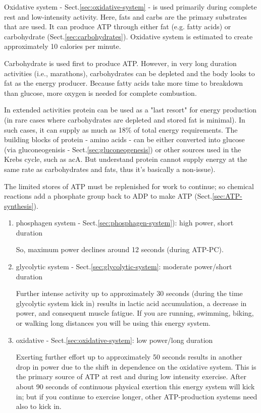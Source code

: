 \begin{mdframed}

Oxidative system - Sect.\ref{sec:oxidative-system} - is used primarily during
complete rest and low-intensity activity. Here, fats and carbs are the primary
substrates that are used. It can produce ATP through either fat (e.g. fatty
acids) or carbohydrate (Sect.\ref{sec:carbohydrates}).
Oxidative system is estimated to create approximately 10 calories per minute.

Carbohydrate is used first to produce ATP. However, in very long duration
activities (i.e., marathons), carbohydrates can be depleted and the body looks
to fat as the energy producer. Because fatty acids take more time to breakdown
than glucose, more oxygen is needed for complete combustion.

In extended activities protein can be used as a "last resort" for energy
production (in rare cases where carbohydrates are depleted and stored fat is
minimal). In such cases, it can supply as much as 18\% of total energy
requirements. The building blocks of protein - amino acids - can be either
converted into glucose (via gluconeogenisis - Sect.\ref{sec:gluconeogenesis}) or
other sources used in the Krebs cycle, such as acA. But understand protein
cannot supply energy at the same rate as carbohydrates and fats, thus it's
basically a non-issue).
\end{mdframed}

The limited stores of ATP must be replenished for work to continue; so chemical
reactions add a phosphate group back to ADP to make ATP
(Sect.\ref{sec:ATP-synthesis}).

\begin{enumerate}
  \item phosphagen system -   Sect.\ref{sec:phosphagen-system}):
  high power, short duration

So, maximum power declines around 12 seconds (during ATP-PC).

  \item glycolytic system - Sect.\ref{sec:glycolytic-system}: moderate
  power/short duration

Further intense activity up to approximately 30 seconds (during the time
glycolytic system kick in) results in lactic acid accumulation, a decrease in
power, and consequent muscle fatigue. If you are running, swimming, biking, or
walking long distances you will be using this energy system.

  \item oxidative - Sect.\ref{sec:oxidative-system}: low power/long duration

Exerting further effort up to approximately 50 seconds results in another drop
in power due to the shift in dependence on the oxidative system.
This is the primary source of ATP at rest and during low intensity exercise.
After about 90 seconds of continuous physical exertion this energy system will
kick in; but if you continue to exercise longer, other ATP-production systems
need also to kick in.

\end{enumerate}


